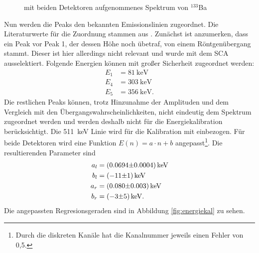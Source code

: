\begin{figure}[h!]
\begin{subfigure}[h]{0.5\textwidth}
    \label{fig:ba_kal_rechts}
  \end{subfigure}
  \caption{mit beiden Detektoren aufgenommenes Spektrum von $^{133}$Ba}
  \label{fig:ba_kal}
\end{figure}

Nun werden die Peaks den bekannten Emissionslinien zugeordnet. Die Literaturwerte für die Zuordnung stammen aus \cite{baspektrum}. Zunächst ist anzumerken, dass ein Peak vor Peak 1, der dessen Höhe noch übetraf, von einem Röntgenübergang stammt. Dieser ist hier allerdings nicht relevant und wurde mit dem SCA ausselektiert. Folgende Energien können mit großer Sicherheit zugeordnet werden:
\begin{align*}
  E_1&=\SI{81}{\kilo\electronvolt}\\
  E_4&=\SI{303}{\kilo\electronvolt}\\
  E_5&=\SI{356}{\kilo\electronvolt}.
\end{align*}
Die restlichen Peaks können, trotz Hinzunahme der Amplituden und dem Vergleich mit den Übergangswahrscheinlichkeiten, nicht eindeutig dem Spektrum zugeordnet werden und werden deshalb nicht für die Energiekalibration berücksichtigt. Die \SI{511}{\kilo\electronvolt} Linie wird für die Kalibration mit einbezogen. Für beide Detektoren wird eine Funktion $E(n)=a\cdot n+b$ angepasst\footnote{Durch die diskreten Kanäle hat die Kanalnummer jeweils einen Fehler von 0,5.}. Die resultierenden Parameter sind
\begin{align*}
  a_l&=\SI[separate-uncertainty=true]{0.0694 \pm 0.0004}{\kilo\electronvolt}\\
  b_l&=\SI[separate-uncertainty=true]{-11 \pm 1}{\kilo\electronvolt}\\
  a_r&=\SI[separate-uncertainty=true]{0,080 \pm 0,003}{\kilo\electronvolt}\\
  b_r&=\SI[separate-uncertainty=true]{-3 \pm 5}{\kilo\electronvolt}.
\end{align*}
Die angepassten Regresionsgeraden sind in Abbildung \ref{fig:energiekal} zu sehen.
